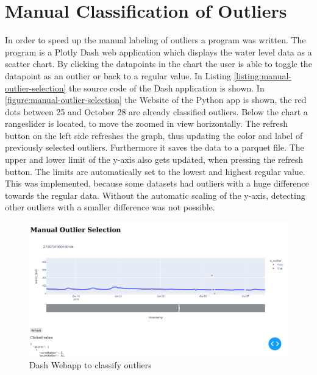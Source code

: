 \section{Manual Classification of Outliers}
In order to speed up the manual labeling of outliers a program was written. The program is a Plotly Dash \cite{DashDocumentationUser} web application which displays the water level data as a scatter chart. 
By clicking the datapoints in the chart the user is able to toggle the datapoint as an outlier or back to a regular value. 
In Listing \ref{listing:manual-outlier-selection} the source code of the Dash application is shown. 
In \autoref{figure:manual-outlier-selection} the Website of the Python app is shown, the red dots between 25 and October 28 are already classified outliers. Below the chart a rangeslider is located, to move the zoomed in view horizontally. 
The refresh button on the left side refreshes the graph, thus updating the color and label of previously selected outliers. Furthermore it saves the data to a parquet file.
The upper and lower limit of the y-axis also gets updated, when pressing the refresh button. 
The limits are automatically set to the lowest and highest regular value. 
This was implemented, because some datasets had outliers with a huge difference towards the regular data. 
Without the automatic scaling of the y-axis, detecting other outliers with a smaller difference was not possible.
\begin{figure}[H]
    \centering
    \includegraphics[width=\textwidth]{./pics/manual-outlier-selection.png}
    \caption{Dash Webapp to classify outliers}
    \label{figure:manual-outlier-selection}
\end{figure}

